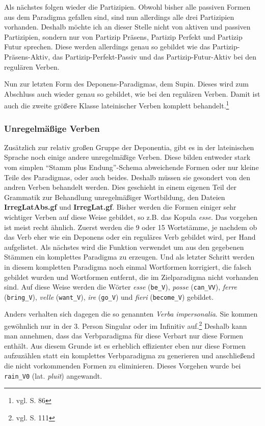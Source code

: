 \documentclass[fontsize=12pt,abstract=on,titlepage,bibliography=totoc,ngerman,listof=totoc]{scrreprt}
\begin{document}
Als nächstes folgen wieder die Partizipien. Obwohl bisher alle passiven Formen aus dem Paradigma gefallen sind, sind nun allerdings alle drei Partizipien vorhanden. Deshalb möchte ich an dieser Stelle nicht von aktiven und passiven Partizipien, sondern nur von Partizip Präsens, Partizip Perfekt und Partizip Futur sprechen. Diese werden allerdings genau so gebildet wie das Partizip-Präsens-Aktiv, das Partizip-Perfekt-Passiv und das Partizip-Futur-Aktiv bei den regulären Verben. \par
Nun zur letzten Form des Deponens-Paradigmas, dem Supin. Dieses wird zum Abschluss auch wieder genau so gebildet, wie bei den regulären Verben. Damit ist auch die zweite größere Klasse lateinischer Verben komplett behandelt.\footnote{vgl. \cite{BAYER-LINDAUER1994} S. 86} \par
\subsubsection{Unregelmäßige Verben}
Zusätzlich zur relativ großen Gruppe der Deponentia, gibt es in der lateinischen Sprache noch einige andere unregelmäßige Verben. Diese bilden entweder stark vom simplen ``Stamm plus Endung''-Schema abweichende Formen oder nur kleine Teile des Paradigmas, oder auch beides. Deshalb müssen sie gesondert von den andren Verben behandelt werden. Dies geschieht in einem eigenen Teil der Grammatik zur Behandlung unregelmäßiger Wortbildung, den Dateien \textbf{IrregLatAbs.gf} und \textbf{IrregLat.gf}. Bisher werden die Formen einiger sehr wichtiger Verben auf diese Weise gebildet, so z.B. das Kopula \textit{esse}. Das vorgehen ist meist recht ähnlich. Zuerst werden die 9 oder 15 Wortstämme, je nachdem ob das Verb eher wie ein Deponens oder ein reguläres Verb gebildet wird, per Hand aufgelistet. Als nächstes wird die Funktion verwendet um aus den gegebenen Stämmen ein komplettes Paradigma zu erzeugen. Und als letzter Schritt werden in diesem kompletten Paradigma noch einmal Wortformen korrigiert, die falsch gebildet wurden und Wortformen entfernt, die im Zielparadigma nicht vorhanden sind. Auf diese Weise werden die Wörter \textit{esse} (\texttt{be\_V}), \textit{posse} (\texttt{can\_VV}), \textit{ferre} (\texttt{bring\_V}), \textit{velle} (\texttt{want\_V}), \textit{ire} (\texttt{go\_V}) und \textit{fieri} (\texttt{become\_V}) gebildet. \par
Anders verhalten sich dagegen die so genannten \textit{Verba impersonalia}. Sie kommen gewöhnlich nur in der 3. Person Singular oder im Infinitiv auf.\footnote{vgl. \cite{BAYER-LINDAUER1994} S. 111} Deshalb kann man annehmen, dass das Verbparadigma für diese Verbart nur diese Formen enthält. Aus diesem Grunde ist es erheblich effizienter eben nur diese Formen aufzuzählen statt ein komplettes Verbparadigma zu generieren und anschließend die nicht vorkommenden Formen zu eliminieren. Dieses Vorgehen wurde bei \texttt{rain\_V0} (lat. \textit{pluit}) angewandt.
\end{document}
